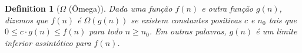 \documentclass{article}
\newtheorem{definition}{Definition}[section]
\begin{document}
\begin{definition}[$\Omega$ (Ômega)]
    Dada uma função \( f(n) \) e outra função \( g(n) \), dizemos que \( f(n) \) é \( \Omega(g(n)) \) se existem constantes positivas \( c \) e \( n_0 \) tais que \( 0 \leq c \cdot g(n) \leq f(n) \) para todo \( n \geq n_0 \). Em outras palavras, \( g(n) \) é um limite inferior assintótico para \( f(n) \).
\end{definition}    

% 
\end{document}
